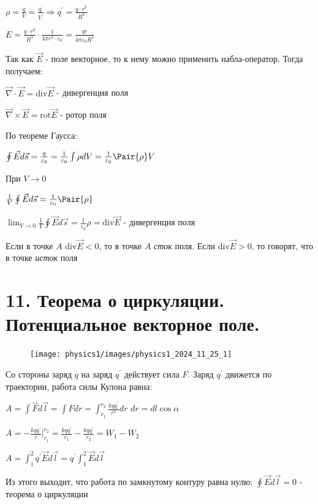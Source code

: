 \documentclass[12pt]{article}
\begin{document}
    $\rho = \frac{q}{V} = \frac{q^\prime}{V^\prime} \Longrightarrow q^\prime = \frac{q \cdot r^3}{R^3}$

    $E = \frac{q \cdot r^3}{R^3} \cdot \frac{1}{4\pi r^2 \cdot \varepsilon_0} = \frac{q r}{4\pi \varepsilon_0 R^3}$

    \mediumvspace

    Так как $\vec{E}$ - поле векторное, то к нему можно применить набла-оператор. Тогда получаем:

    $\vec{\nabla} \cdot \vec{E} = \mathrm{div}\vec{E}$ - дивергенция поля

    $\vec\nabla \times \vec{E} = \mathrm{rot}\vec{E}$ - ротор поля

    По теореме Гаусса:

    $\oint \vec{E} d\vec{s} = \frac{q}{\varepsilon_0} = \frac{1}{\varepsilon_0} \int \rho dV = 
    \frac{1}{\varepsilon_0} \Pair{\rho} V$

    При $V \to 0$

    $\frac{1}{V} \oint \vec{E} d\vec{s} = \frac{1}{\varepsilon_0} \Pair{\rho}$

    $\lim_{V \to 0} \frac{1}{V} \oint \vec{E} d\vec{s} = \frac{1}{\varepsilon_0} \rho = \mathrm{div}\vec{E}$ - дивергенция поля

    Если в точке $A$ $\mathrm{div} \vec{E} < 0$, то в точке $A$ \textit{сток} поля. Если $\mathrm{div} \vec{E} > 0$, 
    то говорят, что в точке \textit{исток} поля






\section{11. Теорема о циркуляции. Потенциальное векторное поле.}

\begin{minipage}{\textwidth}
    \begin{figure}
        \texttt{[image: physics1/images/physics1\_2024\_11\_25\_1]}
    \end{figure}

    Со стороны заряд $q$ на заряд $q^\prime$ действует сила $F$. Заряд $q^\prime$ движется по траектории, работа силы Кулона равна:

    $A = \int \vec{F}d\vec{l} = \int F dr = \int_{r_1}^{r_2} \frac{kqq^\prime}{r^2} dr$ \hfill $dr = dl \cos\alpha$

    $A = -\frac{kqq^\prime}{r} \Big|_{r_1}^{r_2} = \frac{kqq^\prime}{r_1} - \frac{kqq^\prime}{r_2} = W_1 - W_2$

    $A = \int_1^2 q^\prime \vec{E} d\vec{l} = q^\prime \int_1^2 \vec{E}d\vec{l}$

    Из этого выходит, что работа по замкнутому контуру равна нулю: $\oint \vec{E}d\vec{l} = 0$ - теорема о циркуляции
\end{minipage}
\end{document}
